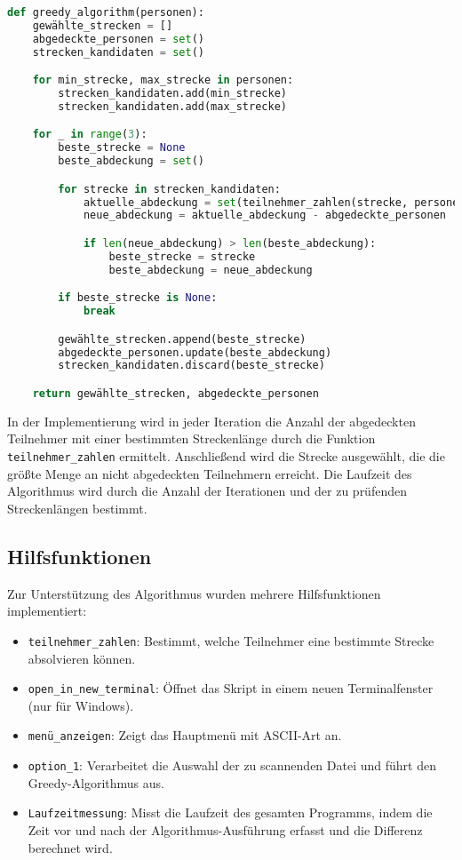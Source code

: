 \documentclass[a4paper,10pt,ngerman]{scrartcl}
\begin{document}
\begin{lstlisting}[language=Python]
def greedy_algorithm(personen):
    gewählte_strecken = []
    abgedeckte_personen = set()
    strecken_kandidaten = set()

    for min_strecke, max_strecke in personen:
        strecken_kandidaten.add(min_strecke)
        strecken_kandidaten.add(max_strecke)

    for _ in range(3):
        beste_strecke = None
        beste_abdeckung = set()

        for strecke in strecken_kandidaten:
            aktuelle_abdeckung = set(teilnehmer_zahlen(strecke, personen))
            neue_abdeckung = aktuelle_abdeckung - abgedeckte_personen

            if len(neue_abdeckung) > len(beste_abdeckung):
                beste_strecke = strecke
                beste_abdeckung = neue_abdeckung

        if beste_strecke is None:
            break

        gewählte_strecken.append(beste_strecke)
        abgedeckte_personen.update(beste_abdeckung)
        strecken_kandidaten.discard(beste_strecke)

    return gewählte_strecken, abgedeckte_personen
\end{lstlisting}

In der Implementierung wird in jeder Iteration die Anzahl der abgedeckten Teilnehmer mit einer bestimmten Streckenlänge durch die Funktion \texttt{teilnehmer\_zahlen} ermittelt. Anschließend wird die Strecke ausgewählt, die die größte Menge an nicht abgedeckten Teilnehmern erreicht. Die Laufzeit des Algorithmus wird durch die Anzahl der Iterationen und der zu prüfenden Streckenlängen bestimmt.


\subsection{Hilfsfunktionen}

Zur Unterstützung des Algorithmus wurden mehrere Hilfsfunktionen implementiert:

\begin{itemize}
    \item \texttt{teilnehmer\_zahlen}: Bestimmt, welche Teilnehmer eine bestimmte Strecke absolvieren können.
    \item \texttt{open\_in\_new\_terminal}: Öffnet das Skript in einem neuen Terminalfenster (nur für Windows).
    \item \texttt{menü\_anzeigen}: Zeigt das Hauptmenü mit ASCII-Art an.
    \item \texttt{option\_1}: Verarbeitet die Auswahl der zu scannenden Datei und führt den Greedy-Algorithmus aus.
    \item \texttt{Laufzeitmessung}: Misst die Laufzeit des gesamten Programms, indem die Zeit vor und nach der Algorithmus-Ausführung erfasst und die Differenz berechnet wird.
\end{itemize}
\end{document}
